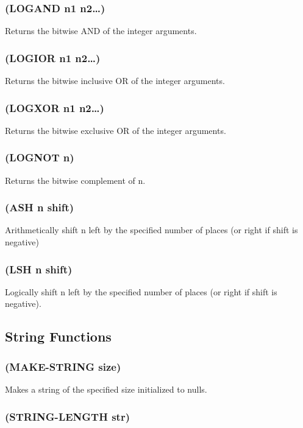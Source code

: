 \documentclass[11pt]{article}
\begin{document}
\subsubsection{(LOGAND n1 n2\ldots{})}
\label{sec-4-27-1}

Returns the bitwise AND of the integer arguments.
\subsubsection{(LOGIOR n1 n2\ldots{})}
\label{sec-4-27-2}

Returns the bitwise inclusive OR of the integer arguments.
\subsubsection{(LOGXOR n1 n2\ldots{})}
\label{sec-4-27-3}

Returns the bitwise exclusive OR of the integer arguments.
\subsubsection{(LOGNOT n)}
\label{sec-4-27-4}

Returns the bitwise complement of n.
\subsubsection{(ASH n shift)}
\label{sec-4-27-5}

Arithmetically shift n left by the specified number of places (or
right if shift is negative)
\subsubsection{(LSH n shift)}
\label{sec-4-27-6}

Logically shift n left by the specified number of places (or right if
shift is negative).
\subsection{String Functions}
\label{sec-4-28}

\subsubsection{(MAKE-STRING size)}
\label{sec-4-28-1}

Makes a string of the specified size initialized to nulls.
\subsubsection{(STRING-LENGTH str)}
\label{sec-4-28-2}
\end{document}
